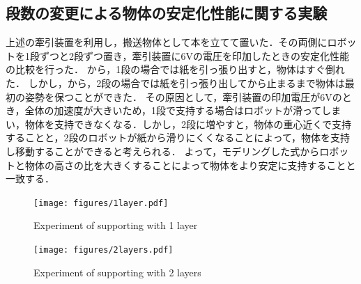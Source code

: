 \subsection{段数の変更による物体の安定化性能に関する実験}
上述の牽引装置を利用し，搬送物体として本を立てて置いた．その両側にロボットを1段ずつと2段ずつ置き，牽引装置に6Vの電圧を印加したときの安定化性能の比較を行った．
から，1段の場合では紙を引っ張り出すと，物体はすぐ倒れた．
しかし，から，2段の場合では紙を引っ張り出してから止まるまで物体は最初の姿勢を保つことができた．
その原因として，牽引装置の印加電圧が6Vのとき，全体の加速度が大きいため，1段で支持する場合はロボットが滑ってしまい，物体を支持できなくなる．しかし，2段に増やすと，物体の重心近くで支持することと，2段のロボットが紙から滑りにくくなることによって，物体を支持し移動することができると考えられる．
よって，モデリングした式からロボットと物体の高さの比を大きくすることによって物体をより安定に支持することと一致する．
\begin{figure}[tb]
  \centering
  \texttt{[image: figures/1layer.pdf]}
  \caption{Experiment of supporting with 1 layer}
  \label{fig:1layer}
\end{figure}
\begin{figure}[tb]
  \centering
  \texttt{[image: figures/2layers.pdf]}
  \caption{Experiment of supporting with 2 layers}
  \label{fig:2layer}
\end{figure}

